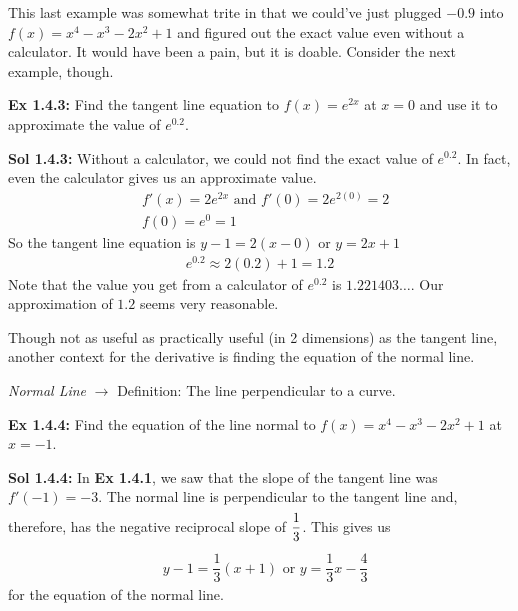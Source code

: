 This last example was somewhat trite in that we could've just plugged $-0.9$ into $f(x) = x^4 - x^3 - 2x^2 + 1$ and figured out the exact value even without a calculator. It would have been a pain, but it is doable. Consider the next example, though. \par

\begin{tcolorbox}[example] 
    \textbf{Ex 1.4.3: } Find the tangent line equation to $f(x) = e^{2x}$ at $x = 0$ and use it to approximate the value of $e^{0.2}$.
\end{tcolorbox}
\begin{tcolorbox}[solution]
    \textbf{Sol 1.4.3: } Without a calculator, we could not find the exact value of $e^{0.2}$. In fact, even the calculator gives us an approximate value. \begin{align*}
        & f'(x) = 2e^{2x} \text{ and } f'(0) = 2e^{2(0)} = 2 \\[11pt]
        & f(0) = e^0 = 1 
    \end{align*} 
    So the tangent line equation is $\boxed{y - 1 = 2(x - 0)}$ or $y = \boxed{2x + 1}$ \begin{align*}
        e^{0.2} \approx 2(0.2)+ 1 = \boxed{1.2}
    \end{align*}
    Note that the value you get from a calculator of $e^{0.2}$ is $1.221403 \dots$. Our approximation of $1.2$ seems very reasonable.
\end{tcolorbox}

Though not as useful as practically useful (in 2 dimensions) as the tangent line, another context for the derivative is finding the equation of the normal line. \par

\begin{tcolorbox}[definition]
    \textit{Normal Line} $\rightarrow$ Definition: The line perpendicular to a curve.
\end{tcolorbox} \vspace{11pt}

\begin{tcolorbox}[example]
    \textbf{Ex 1.4.4: } Find the equation of the line normal to $f(x) = x^4 - x^3 - 2x^2 + 1$ at $x = -1$.
\end{tcolorbox}
\begin{tcolorbox}[solution]
    \textbf{Sol 1.4.4: } In \textbf{Ex 1.4.1}, we saw that the slope of the tangent line was $f'(-1) = -3$. The normal line is perpendicular to the tangent line and, therefore, has the negative reciprocal slope of $\dfrac{1}{3} \forcespace$. This gives us \begin{align*}
        & \boxed{y - 1 = \dfrac{1}{3}(x + 1)} \text{ or } \boxed{y = \dfrac{1}{3}x - \dfrac{4}{3}}
    \end{align*} for the equation of the normal line.
\end{tcolorbox}

